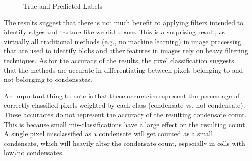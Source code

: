 \documentclass[12pt]{article}
\begin{document}
\begin{figure}[H]
    \centering
    {
        {
        }
        {
        }
    }\caption{True and Predicted Labels}
    \label{fig:labels}
\end{figure}

The results suggest that there is not much benefit to applying filters intended to identify edges
and texture like we did above. This is a surprising result, as virtually all traditional methods
(e.g., no machine learning) in image processing that are used to identify blobs and other features in
images rely on heavy filtering techniques. As for the accuracy of the results, the pixel
classification suggests that the methods are accurate in differentiating between pixels belonging to
and not belonging to condensates.

An important thing to note is that these accuracies represent the percentage of correctly classified
pixels weighted by each class (condensate vs. not condensate). These accuracies do not represent
the accuracy of the resulting condensate count. This is because small mis-classifications have a 
large effect on the resulting count. A single pixel misclassified as a condensate will get counted 
as a small condensate, which will heavily alter the condensate count, especially in cells 
with low/no condensates.
\end{document}
